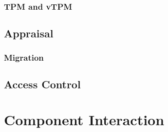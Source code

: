 \documentclass[10pt]{article}
\begin{document}
\subsubsection{TPM and vTPM}

\subsection{Appraisal}

\subsubsection{Migration}

\subsection{Access Control}

\section{Component Interaction}

\appendix




\end{document}
